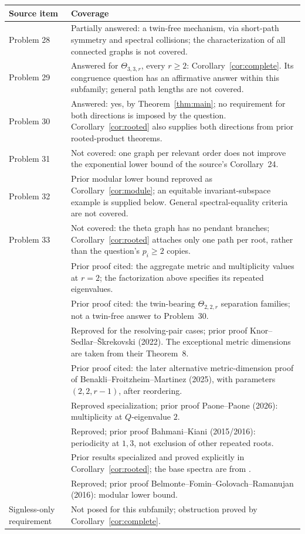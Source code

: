 \documentclass[11pt]{article}
\newcommand{\Th}{\Theta}
\begin{document}
\begin{center}\small
\begin{tabular}{@{}p{27mm}p{118mm}@{}}
\toprule
Source item&Coverage\\\midrule
Problem 28&Partially answered: a twin-free mechanism, via short-path
symmetry and spectral collisions; the characterization of all connected
graphs is not covered.\\
Problem 29&Answered for $\Th_{3,3,r}$, every $r\geq2$:
Corollary~\ref{cor:complete}. Its congruence question has an affirmative
answer within this subfamily; general path lengths are not covered.\\
Problem 30&Answered: yes, by Theorem~\ref{thm:main}; no requirement for
both directions is imposed by the question. Corollary~\ref{cor:rooted}
also supplies both directions from prior rooted-product theorems.\\
Problem 31&Not covered: one graph per relevant order does not improve
the exponential lower bound of the source's Corollary~24.\\
Problem 32&Prior modular lower bound reproved as
Corollary~\ref{cor:module}; an equitable invariant-subspace example is
supplied below. General spectral-equality criteria are not covered.\\
Problem 33&Not covered: the theta graph has no pendant branches;
Corollary~\ref{cor:rooted} attaches only one path per root, rather
than the question's $p_i\geq2$ copies.\\
\cite[Table~2, row~2]{AKS}&Prior proof cited: the aggregate metric and
multiplicity values at $r=2$; the factorization above specifies its
repeated eigenvalues.\\
\cite[Theorem~25, Corollary~26]{AKS}&Prior proof cited: the twin-bearing
$\Th_{2,2,r}$ separation families; not a twin-free answer to Problem~30.\\
\cite[Theorems~8, 14]{KSS}&Reproved for the resolving-pair cases;
prior proof Knor--Sedlar--\v{S}krekovski (2022). The exceptional metric
dimensions are taken from their Theorem~8.\\
\cite[Theorem~4.4]{BFM}&Prior proof cited: the later alternative
metric-dimension proof of Benakli--Froitzheim--Martinez (2025), with
parameters $(2,2,r-1)$, after reordering.\\
\cite[Corollary~8.1]{PP}&Reproved specialization;
prior proof Paone--Paone (2026): multiplicity at $Q$-eigenvalue $2$.\\
\cite[Corollary~16]{BK}&Reproved; prior proof Bahmani--Kiani
(2015/2016): periodicity at $1,3$, not exclusion of other repeated roots.\\
\cite{J,FW,CMRR}&Prior results specialized and proved explicitly
in Corollary~\ref{cor:rooted}; the base spectra are from \cite{AKS}.\\
\cite[Section~4, Lemma~7]{BFG}&Reproved; prior proof
Belmonte--Fomin--Golovach--Ramanujan (2016): modular lower bound.\\
Signless-only requirement&Not posed for this subfamily; obstruction
proved by Corollary~\ref{cor:complete}.\\
\bottomrule
\end{tabular}
\end{center}
\end{document}
